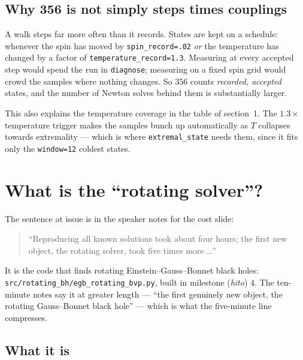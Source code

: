 \documentclass[11pt,a4paper]{article}
\newcommand{\q}[1]{\subsection*{\color{accent}#1}}
\begin{document}
\q{Why 356 is not simply steps times couplings}

A walk steps far more often than it records. States are kept on a schedule:
whenever the spin has moved by \texttt{spin\_record=.02} \emph{or} the
temperature has changed by a factor of \texttt{temperature\_record=1.3}.
Measuring at every accepted step would spend the run in \texttt{diagnose};
measuring on a fixed spin grid would crowd the samples where nothing changes.
So $356$ counts \emph{recorded, accepted} states, and the number of Newton
solves behind them is substantially larger.

This also explains the temperature coverage in the table of section~1. The
$1.3\times$ temperature trigger makes the samples bunch up automatically as $T$
collapses towards extremality --- which is where \texttt{extremal\_state} needs
them, since it fits only the \texttt{window=12} coldest states.

\section{What is the ``rotating solver''?}
\label{sec:solver}

\noindent The sentence at issue is in the speaker notes for the cost slide:
\begin{quote}
``Reproducing all known solutions took about four hours; the first new object,
the rotating solver, took five times more \dots''
\end{quote}

\noindent It is the code that finds rotating Einstein--Gauss--Bonnet black
holes: \texttt{src/rotating\_bh/egb\_rotating\_bvp.py}, built in milestone
(\emph{hito}) 4. The ten-minute notes say it at greater length --- ``the first
genuinely new object, the rotating Gauss--Bonnet black hole'' --- which is what
the five-minute line compresses.

\q{What it is}
\end{document}
